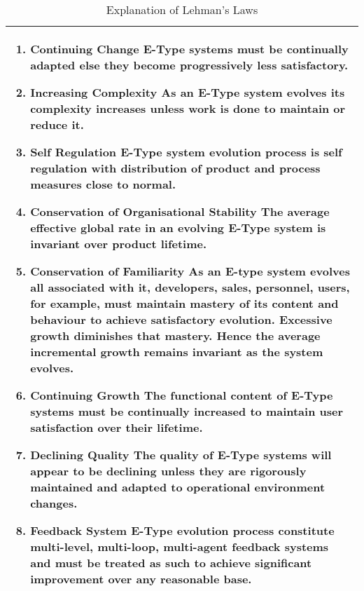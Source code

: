 \documentclass{sig-alternate}
\begin{document}
\begin{table}
       \centering
       \begin{tabular}[ht]{p{3in}}
       \toprule
              \begin{enumerate}
              \item \textbf{Continuing Change} \newline
              E-Type systems must be continually adapted else they become progressively less satisfactory.                     
              \item \textbf{Increasing Complexity}\newline 
              As an E-Type system evolves its complexity increases unless work is done to maintain or reduce it.                  
              \item \textbf{Self Regulation}\newline 
              E-Type system evolution process is self regulation with distribution of product and process measures close to normal.                     
              \item \textbf{Conservation of Organisational Stability}\newline 
              The average effective global rate in an evolving E-Type system is invariant over product lifetime.                     
              \item \textbf{Conservation of Familiarity}\newline 
              As an E-type system evolves all associated with it, developers, sales, personnel, users, for example, must maintain mastery of its content and behaviour to achieve satisfactory evolution. Excessive growth diminishes that mastery. Hence the average incremental growth remains invariant as the system evolves.                     
              \item \textbf{Continuing Growth}\newline 
              The functional content of E-Type systems must be continually increased to maintain user satisfaction over their lifetime.                
              \item \textbf{Declining Quality}\newline 
              The quality of E-Type systems will appear to be declining unless they are rigorously maintained and adapted to operational environment changes.                     
              \item \textbf{Feedback System}\newline 
              E-Type evolution process constitute multi-level, multi-loop, multi-agent feedback systems and must be treated as such to achieve significant improvement over any reasonable base.

              \end{enumerate} \\
              \bottomrule
       \end{tabular}
       \caption{Explanation of Lehman's Laws}
       \label{table:expl_laws}
\end{table}
\end{document}
